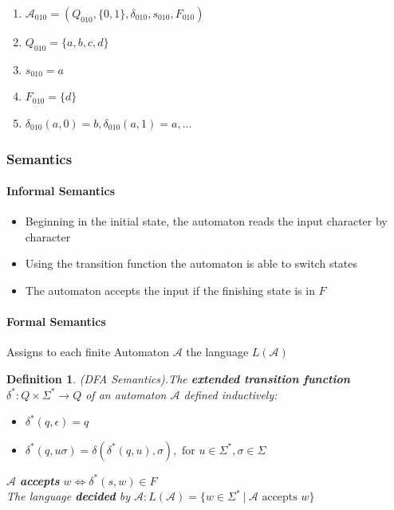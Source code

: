 \documentclass[a3paper, 8pt]{extarticle}
\newtheorem*{definition}{Definition}
\begin{document}
\begin{multicols*}{6}
\begin{enumerate}
    \item[] $\mathcal{A}_{010} = (Q_{010}, \{0, 1\}, \delta_{010}, s_{010}, F_{010})$
    \item[] $Q_{010} = \{ a, b, c, d\}$
    \item[] $s_{010} = a$
    \item[] $F_{010} = \{ d \}$
    \item[] $\delta_{010}(a, 0) = b, \delta_{010}(a,1) = a, ...$
\end{enumerate}


\subsubsection{Semantics}
\paragraph{Informal Semantics}
\begin{itemize}
    \item Beginning in the initial state, the automaton reads the input character by character
    \item Using the transition function the automaton is able to switch states
    \item The automaton accepts the input if the finishing state is in $F$
\end{itemize}

\paragraph{Formal Semantics}
Assigns to each finite Automaton $\mathcal{A}$ the language $L(\mathcal{A})$
\begin{definition}
    (DFA Semantics).The \textbf{extended transition function} $\delta^*:Q \times \Sigma^* \to Q$ of an automaton $\mathcal{A}$ defined inductively:\begin{itemize}
            \item $\delta^*(q, \epsilon) = q$
            \item $\delta^*(q, u \sigma) = \delta(\delta^*(q,u),\sigma), \text{ for } u \in \Sigma^*, \sigma \in \Sigma$        \end{itemize}

    $\mathcal{A}$ \textbf{accepts} $w \iff \delta^*(s, w) \in F$
        \\ The language \textbf{decided} by $\mathcal{A}: L(\mathcal{A}) = \{w \in \Sigma^* \:|\: \mathcal{A} \text{ accepts }w\}$
\end{definition}


\end{multicols*}
\end{document}
